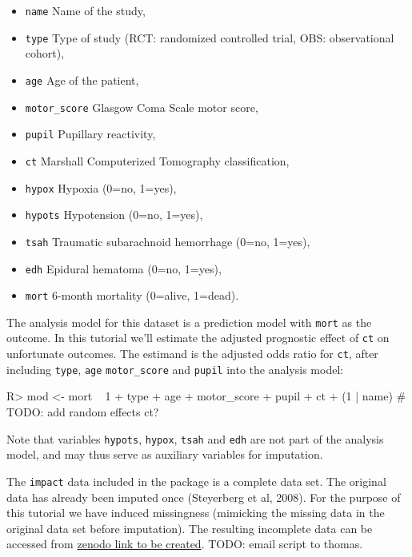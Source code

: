 \documentclass[
]{jss}
\providecommand{\tightlist}{%
  \setlength{\itemsep}{0pt}\setlength{\parskip}{0pt}}
\begin{document}
\begin{itemize}
\tightlist
\item
  \texttt{name} Name of the study,
\item
  \texttt{type} Type of study (RCT: randomized controlled trial, OBS:
  observational cohort),
\item
  \texttt{age} Age of the patient,
\item
  \texttt{motor\_score} Glasgow Coma Scale motor score,
\item
  \texttt{pupil} Pupillary reactivity,
\item
  \texttt{ct} Marshall Computerized Tomography classification,
\item
  \texttt{hypox} Hypoxia (0=no, 1=yes),
\item
  \texttt{hypots} Hypotension (0=no, 1=yes),
\item
  \texttt{tsah} Traumatic subarachnoid hemorrhage (0=no, 1=yes),
\item
  \texttt{edh} Epidural hematoma (0=no, 1=yes),
\item
  \texttt{mort} 6-month mortality (0=alive, 1=dead).
\end{itemize}

The analysis model for this dataset is a prediction model with
\texttt{mort} as the outcome. In this tutorial we'll estimate the
adjusted prognostic effect of \texttt{ct} on unfortunate outcomes. The
estimand is the adjusted odds ratio for \texttt{ct}, after including
\texttt{type}, \texttt{age} \texttt{motor\_score} and \texttt{pupil}
into the analysis model:

\begin{CodeChunk}
\begin{CodeInput}
R> mod <- mort ~ 1 + type + age + motor_score + pupil + ct + (1 | name) # TODO: add random effects ct?
\end{CodeInput}
\end{CodeChunk}

Note that variables \texttt{hypots}, \texttt{hypox}, \texttt{tsah} and
\texttt{edh} are not part of the analysis model, and may thus serve as
auxiliary variables for imputation.

The \texttt{impact} data included in the  package is a
complete data set. The original data has already been imputed once
(Steyerberg et al, 2008). For the purpose of this tutorial we have
induced missingness (mimicking the missing data in the original data set
before imputation). The resulting incomplete data can be accessed from
\href{https://zenodo.com}{zenodo link to be created}. TODO: email script
to thomas.
\end{document}
